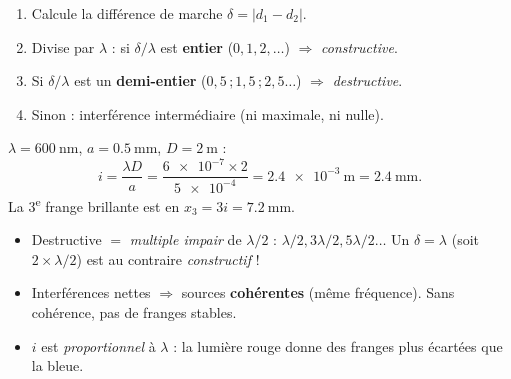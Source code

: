 \documentclass[11pt,a4paper]{article}
\begin{document}
\begin{methode}
\begin{enumerate}[leftmargin=1.6em,topsep=2pt,itemsep=1.5pt,label=\arabic*.]
  \item Calcule la différence de marche $\delta=|d_1-d_2|$.
  \item Divise par $\lambda$ : si $\delta/\lambda$ est \textbf{entier} ($0,1,2,\dots$)
        $\Rightarrow$ \emph{constructive}.
  \item Si $\delta/\lambda$ est un \textbf{demi-entier} ($0{,}5\,;1{,}5\,;2{,}5\dots$)
        $\Rightarrow$ \emph{destructive}.
  \item Sinon : interférence intermédiaire (ni maximale, ni nulle).
\end{enumerate}
\end{methode}

\begin{exemplebox}
$\lambda=\SI{600}{\nano\metre}$, $a=\SI{0.5}{\milli\metre}$, $D=\SI{2}{\metre}$ :
\[ i=\frac{\lambda D}{a}=\frac{\num{6e-7}\times 2}{\num{5e-4}}=\SI{2.4e-3}{\metre}=\SI{2.4}{\milli\metre}. \]
La 3\textsuperscript{e} frange brillante est en $x_3=3i=\SI{7.2}{\milli\metre}$.
\end{exemplebox}

\begin{piege}
\begin{itemize}[leftmargin=1.4em,topsep=2pt,itemsep=1.5pt]
  \item Destructive $=$ \emph{multiple impair} de $\lambda/2$ : $\lambda/2, 3\lambda/2, 5\lambda/2\dots$
        Un $\delta=\lambda$ (soit $2\times\lambda/2$) est au contraire \emph{constructif} !
  \item Interférences nettes $\Rightarrow$ sources \textbf{cohérentes} (même fréquence).
        Sans cohérence, pas de franges stables.
  \item $i$ est \emph{proportionnel} à $\lambda$ : la lumière rouge donne des franges plus
        écartées que la bleue.
\end{itemize}
\end{piege}
\end{document}
